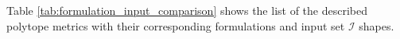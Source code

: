 Table \ref{tab:formulation_input_comparison} shows the list of the described polytope metrics with their corresponding formulations and input set $\mathcal{I}$ shapes.



